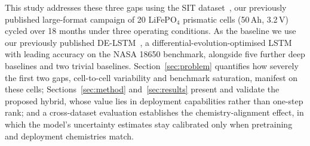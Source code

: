 This study addresses these three gaps using the SIT
dataset~\cite{ponnambalam2026sitdata}, our previously published large-format
campaign of 20 LiFePO$_4$ prismatic cells (50\,Ah, 3.2\,V) cycled over 18 months
under three operating conditions. As the baseline we use our previously published
DE-LSTM~\cite{ponnambalam2026delstm}, a differential-evolution-optimised LSTM with
leading accuracy on the NASA 18650 benchmark, alongside five further deep
baselines and two trivial baselines. Section~\ref{sec:problem} quantifies how
severely the first two gaps, cell-to-cell variability and benchmark saturation,
manifest on these cells; Sections~\ref{sec:method} and~\ref{sec:results} present
and validate the proposed hybrid, whose value lies in deployment capabilities
rather than one-step rank; and a cross-dataset evaluation establishes the
chemistry-alignment effect, in which the model's uncertainty estimates stay
calibrated only when pretraining and deployment chemistries match.

